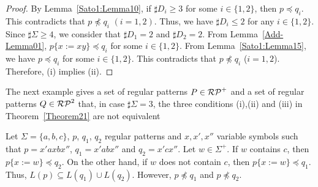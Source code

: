 \begin{proof}
    By Lemma~\ref{Sato1:Lemma10}, %
    if $\sharp D_{i} \geq 3$ for some $i \in \{1,2\}$,
    then $p \preceq q_{i}$.
    This contradicts that $p \not\preceq q_{i}$ $(i=1,2)$.
    Thus, we have $\sharp D_{i} \leq 2$ for any $i \in \{1,2\}$.
    Since $\sharp \Sigma \geq 4$,
    we consider that $\sharp D_{1}=2$ and $\sharp D_{2} = 2$.
    From Lemma~\ref{Add-Lemma01}, %
    $p\{x:=xy\} \preceq q_{i}$ for some $i \in \{1,2\}$.
    From Lemma~\ref{Sato1:Lemma15}, %
    we have $p \preceq q_{i}$ for some $i \in \{1,2\}$.
    This contradicts that $p \not\preceq q_{i}$ ($i=1,2$).
    Therefore, (i) implies (ii).
\end{proof}

The next example gives a set of regular patterns $P \in \mathcal{RP}^{+}$ and a set of regular patterns $Q \in \mathcal{RP}^{2}$ that, 
in case $\sharp\Sigma = 3$, 
the three conditions (i),(ii) and (iii) in Theorem~\ref{Theorem21} are not equivalent


\begin{ex}%
    Let $\Sigma = \{a,b,c\}$, $p$, $q_{1}$, $q_{2}$ regular patterns and
    $x,x',x''$ variable symbols such that
    $p = x'axbx''$, $q_{1} = x'abx''$ and $q_{2} = x'cx''$.
    Let $w \in \Sigma^{+}$.
    If $w$ contains $c$, then $p \{x:=w\} \preceq q_{2}$.
    On the other hand, if $w$ does not contain $c$,
    then $p\{x:=w\} \preceq q_{1}$.
    Thus, $L(p) \subseteq L(q_{1}) \cup L(q_{2})$.
    However, $p \not\preceq q_{1}$ and $p \not\preceq q_{2}$.
\end{ex}

